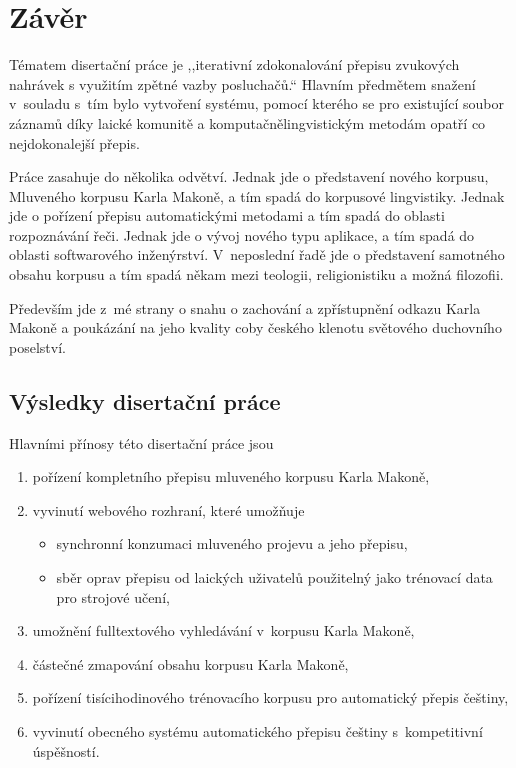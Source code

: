 \chapter{Závěr}
\label{kap:zaver}

Tématem disertační práce je ,,iterativní zdokonalování přepisu zvukových
nahrávek s využitím zpětné vazby posluchačů.`` Hlavním předmětem snažení
v~souladu s~tím bylo vytvoření systému, pomocí kterého se pro existující soubor
záznamů díky laické komunitě a komputačnělingvistickým metodám opatří co
nejdokonalejší přepis.

Práce zasahuje do několika odvětví. Jednak jde o představení nového korpusu,
Mluveného korpusu Karla Makoně, a tím spadá do korpusové lingvistiky. Jednak jde
o pořízení přepisu automatickými metodami a tím spadá do oblasti rozpoznávání
řeči. Jednak jde o vývoj nového typu aplikace, a tím spadá do oblasti
softwarového inženýrství. V~neposlední řadě jde o představení samotného obsahu
korpusu a tím spadá někam mezi teologii, religionistiku a možná filozofii.

Především jde z~mé strany o snahu o zachování a zpřístupnění odkazu Karla Makoně
a poukázání na jeho kvality coby českého klenotu světového duchovního poselství.

\section{Výsledky disertační práce}

Hlavními přínosy této disertační práce jsou

\begin{enumerate}
\item{pořízení kompletního přepisu mluveného korpusu Karla Makoně,}
\item{vyvinutí webového rozhraní, které umožňuje
    \begin{itemize}
    \item{synchronní konzumaci mluveného projevu a jeho přepisu,}
    \item{
        sběr oprav přepisu od laických uživatelů použitelný jako trénovací data
        pro strojové učení,
    }
    \end{itemize}
}
\item{umožnění fulltextového vyhledávání v~korpusu Karla Makoně,}
\item{částečné zmapování obsahu korpusu Karla Makoně,}
\item{
    pořízení tisícihodinového trénovacího korpusu pro automatický přepis
    češtiny,
}
\item{
    vyvinutí obecného systému automatického přepisu češtiny s~kompetitivní
    úspěšností.
}
\end{enumerate}

